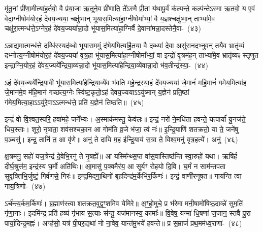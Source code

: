 मृ॑तू॒नां प्री॑णा॒मीत्या॑ह॒र्तवो॒ वै प्र॑या॒जा ऋ॒तूने॒व प्री॑णाति॒ ते᳚\-ऽस्मै प्री॒ता य॑थापू॒र्वं क॑ल्पन्ते॒ कल्प॑न्ते\-ऽस्मा ऋ॒तवो॒ य ए॒वं वेदा॒ग्नी\-षोम॑योर॒हं दे॑वय॒ज्यया॒ चक्षु॑ष्मान् भूयास॒मित्या॑हा॒ग्नी\-षोमा᳚भ्यां॒ वै य॒ज्ञश्चक्षु॑ष्मा॒न् ताभ्या॑मे॒व चक्षु॑रा॒त्मन्ध॑त्ते॒\-ऽग्नेर॒हं दे॑वय॒ज्यया᳚न्ना॒दो भू॑यास॒मित्या॑हा॒ग्निर्वै दे॒वाना॑मन्ना॒दस्तेनै॒वा-~(४३)\ip

ऽन्नाद्य॑मा॒त्मन्ध॑त्ते॒ दब्धि॑र॒स्यद॑ब्धो भूयासम॒मुं द॑भेय॒मित्या॑\-है॒तया॒ वै दब्ध्या॑ दे॒वा असु॑रानदभ्नुव॒न् तयै॒व भ्रातृ॑व्यं दभ्नोत्य॒ग्नी\-षोम॑यो\-र॒हं दे॑वय॒ज्यया॑ वृत्र॒हा भू॑यास॒मित्या॑हा॒ग्नी\-षोमा᳚भ्यां॒ वा इन्द्रो॑ वृ॒त्रम॑ह॒न् ताभ्या॑मे॒व भ्रातृ॑व्यꣴ स्तृणुत इन्द्राग्नि॒योर॒हं दे॑व\-य॒ज्यये᳚\-न्द्रिया॒व्य॑न्ना॒दो भू॑यास॒मित्या॑हेन्द्रिया॒व्ये॑वान्ना॒दो भ॑व॒तीन्द्र॑स्या॒-~(४४)\ip

ऽहं दे॑वय॒ज्यये᳚न्द्रिया॒वी भू॑यास॒मित्या॑हेन्द्रिया॒व्ये॑व भ॑वति महे॒न्द्रस्या॒हं दे॑वय॒ज्यया॑ जे॒मानं॑ महि॒मानं॑ गमेय॒मित्या॑ह जे॒मान॑मे॒व म॑हि॒मानं॑ गच्छत्य॒ग्नेः स्वि॑ष्ट॒कृतो॒\-ऽहं दे॑वय॒ज्यया\-ऽऽ\-यु॑ष्मान् य॒ज्ञेन॑ प्रति॒ष्ठां ग॑मेय॒मित्या॒हा\-ऽऽ\-यु॑रे॒वा\-ऽऽ\-त्मन्ध॑त्ते॒ प्रति॑ य॒ज्ञेन॑ तिष्ठति॥~(४५)\ip

{\anuvakamend[{प्र॒ति॒ष्ठाम॑ह्व॒दस्तु॑ वि॒द्युतं॑ वस॒न्तमे॒वेन्द्र॑स्या॒\-ऽष्टात्रिꣳ॑शच्च}]}%

इन्द्रं॑ वो वि॒श्वत॒स्परि॒ हवा॑महे॒ जने᳚भ्यः। अ॒स्माक॑मस्तु॒ केव॑लः॥ इन्द्रं॒ नरो॑ ने॒मधि॑ता हवन्ते॒ यत्पार्या॑ यु॒नज॑ते॒ धिय॒स्ताः। शूरो॒ नृषा॑ता॒ शव॑सश्चका॒न आ गोम॑ति व्र॒जे भ॑जा॒ त्वं नः॑॥ इ॒न्द्रि॒याणि॑ शतक्रतो॒ या ते॒ जने॑षु प॒ञ्चसु॑। इन्द्र॒ तानि॑ त॒ आ वृ॑णे॥ अनु॑ ते दायि म॒ह इ॑न्द्रि॒याय॑ स॒त्रा ते॒ विश्व॒मनु॑ वृत्र॒हत्ये᳚। अनु॑~(४६)\ip

क्ष॒त्रमनु॒ सहो॑ यज॒त्रेन्द्र॑ दे॒वेभि॒रनु॑ ते नृ॒षह्ये᳚॥ आ यस्मि᳚न्थ्स॒प्त वा॑स॒वास्तिष्ठ॑न्ति स्वा॒रुहो॑ यथा। ऋषि॑र्\mbox{}ह दीर्घ॒श्रुत्त॑म॒ इन्द्र॑स्य घ॒र्मो अति॑थिः॥ आ॒मासु॑ प॒क्वमैर॑य॒ आ सूर्यꣳ॑ रोहयो दि॒वि। घ॒र्मं न साम॑न्तपता सुवृ॒क्तिभि॒र्जुष्टं॒ गिर्व॑णसे॒ गिरः॑॥ इन्द्र॒मिद्गा॒थिनो॑ बृ॒हदिन्द्र॑म॒र्केभि॑र॒र्किणः॑। इन्द्रं॒ वाणी॑रनूषत॥ गाय॑न्ति त्वा \mbox{गाय॒त्रिणो-~(४७)\ip}

ऽर्च॑न्त्य॒र्कम॒र्किणः॑। ब्र॒ह्माण॑स्त्वा शतक्रत॒वुद्व॒ꣳ॒शमि॑व येमिरे॥ अ॒ꣳ॒हो॒मुचे॒ प्र भ॑रेमा मनी॒षामो॑षिष्ठ॒दाव्न्ने॑ सुम॒तिं गृ॑णा॒नाः। इ॒दमि॑न्द्र॒ प्रति॑ ह॒व्यं गृ॑भाय स॒त्याः स॑न्तु॒ यज॑मानस्य॒ कामाः᳚॥ वि॒वेष॒ यन्मा॑ धि॒षणा॑ ज॒जान॒ स्तवै॑ पु॒रा पार्या॒दिन्द्र॒मह्नः॑। अꣳह॑सो॒ यत्र॑ पी॒पर॒द्यथा॑ नो ना॒वेव॒ यान्त॑मु॒भये॑ हवन्ते॥ प्र स॒म्राजं॑ प्रथ॒मम॑ध्व॒राणा॑-~(४८)\ip


